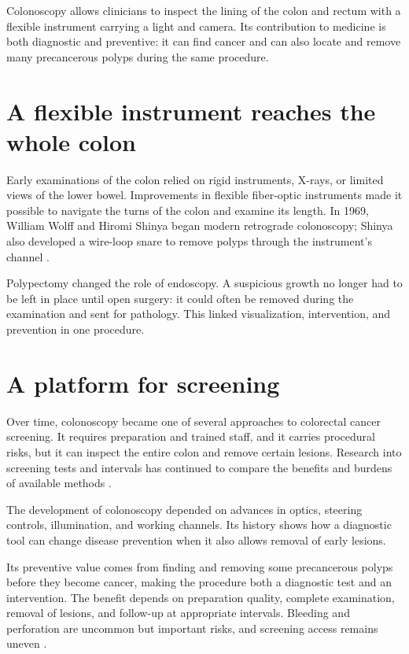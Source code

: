\documentclass[12pt,oneside]{book}
\begin{document}
Colonoscopy allows clinicians to inspect the lining of the colon and rectum
with a flexible instrument carrying a light and camera. Its contribution to
medicine is both diagnostic and preventive: it can find cancer and can also
locate and remove many precancerous polyps during the same procedure.

\section{A flexible instrument reaches the whole colon}
Early examinations of the colon relied on rigid instruments, X-rays, or limited views of the lower bowel. Improvements in flexible fiber-optic instruments made it possible to navigate the turns of the colon and examine its length. In 1969, William Wolff and Hiromi Shinya began modern retrograde colonoscopy; Shinya also developed a wire-loop snare to remove polyps through the instrument's channel \cite{colonoscopyHistory,shinyaPolypectomy}.

Polypectomy changed the role of endoscopy. A suspicious growth no longer had
to be left in place until open surgery: it could often be removed during the
examination and sent for pathology. This linked visualization, intervention,
and prevention in one procedure.

\section{A platform for screening}
Over time, colonoscopy became one of several approaches to colorectal cancer screening. It requires preparation and trained staff, and it carries procedural risks, but it can inspect the entire colon and remove certain lesions. Research into screening tests and intervals has continued to compare the benefits and burdens of available methods \cite{nciColorectalScreening}.

The development of colonoscopy depended on advances in optics, steering
controls, illumination, and working channels. Its history shows how a
diagnostic tool can change disease prevention when it also allows removal of
early lesions.

Its preventive value comes from finding and removing some precancerous polyps
before they become cancer, making the procedure both a diagnostic test and an
intervention. The benefit depends on preparation quality, complete
examination, removal of lesions, and follow-up at appropriate intervals.
Bleeding and perforation are uncommon but important risks, and screening
access remains uneven \cite{shinyaPolypectomy,nciColorectalScreening}.
\end{document}
